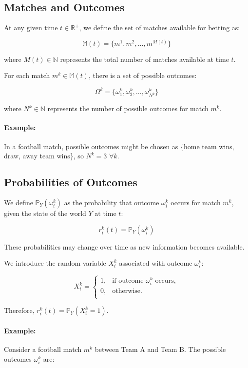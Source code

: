 \subsection{Matches and Outcomes}

At any given time \( t \in \mathbb{R}^+ \), we define the set of matches available for betting as:

\[
\mathbb{M}(t) = \{ m^1, m^2, \dots, m^{M(t)} \}
\]

where \( M(t) \in \mathbb{N} \) represents the total number of matches available at time \( t \).

For each match \( m^k \in \mathbb{M}(t) \), there is a set of possible outcomes:

\[
\Omega^k = \{ \omega_1^k, \omega_2^k, \dots, \omega_{N^k}^k \}
\]

where \( N^k \in \mathbb{N} \) represents the number of possible outcomes for match \( m^k \).

\paragraph{Example:} 
In a football match, possible outcomes might be chosen as \{home team wins, draw, away team wins\}, so \( N^k = 3\) \(\forall k\).

\subsection{Probabilities of Outcomes}

We define \( \mathbb{P}_Y( \omega_i^k ) \) as the probability that outcome \( \omega_i^k \) occurs for match \( m^k \), given the state of the world \( Y \) at time \( t \):

\[
r_i^k(t) = \mathbb{P}_Y( \omega_i^k )
\]

These probabilities may change over time as new information becomes available.

We introduce the random variable \( X_i^k \) associated with outcome \( \omega_i^k \):

\[
X_i^k = \begin{cases}
1, & \text{if outcome } \omega_i^k \text{ occurs}, \\
0, & \text{otherwise}.\\
\end{cases}
\]

Therefore, \( r_i^k(t) = \mathbb{P}_Y( X_i^k = 1 ) \). \\

\paragraph{Example:} 
Consider a football match \( m^k \) between Team A and Team B. The possible outcomes \( \omega_i^k \) are:

